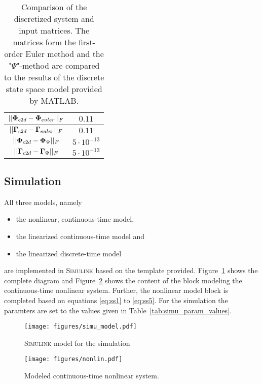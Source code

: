 \begin{table}[h]
	\centering
	\begin{tabular}{c|c}
	\hline
		 $||\boldsymbol{\Phi}_{c2d} - \boldsymbol{\Phi}_{euler}||_F$& $0.11$ \\\hline
		 $||\boldsymbol{\Gamma}_{c2d} - \boldsymbol{\Gamma}_{euler}||_F$& $0.11$ \\\hline
		 $||\boldsymbol{\Phi}_{c2d} - \boldsymbol{\Phi}_{\Psi}||_F$& $5 \cdot 10^{-13}$ \\\hline
		 $||\boldsymbol{\Gamma}_{c2d} - \boldsymbol{\Gamma}_{\Psi}||_F$& $5 \cdot 10^{-13}$ \\\hline
	\end{tabular}
	\caption{Comparison of the discretized system and input matrices. The matrices form the first-order Euler method and the "$\Psi$"-method are compared to the results of the discrete state space model provided by MATLAB.}
	\label{tab:disc_comp}
\end{table}

\subsection{Simulation}
All three models, namely
\begin{itemize}
	\item the nonlinear, continuous-time model,
	\item the linearized continuous-time model and
	\item the linearized discrete-time model
\end{itemize}
are implemented in \textsc{Simulink} based on the template provided. 
Figure~\ref{fig:simu_simulink} shows the complete diagram and Figure~\ref{fig:simu_nonlin_simulink} shows the content of the block modeling the continuous-time nonlinear system.
Further, the nonlinear model block is completed based on equations \eqref{eq:ss1} to \eqref{eq:ss5}.
For the simulation the paramters are set to the values given in Table~\ref{tab:simu_param_values}.

\begin{figure}[h]
	\centering
	\texttt{[image: figures/simu\_model.pdf]}
	\caption{\textsc{Simulink} model for the simulation}
	\label{fig:simu_simulink}
\end{figure}
\begin{figure}[h]
	\centering
	\texttt{[image: figures/nonlin.pdf]}
	\caption{Modeled continuous-time nonlinear system.}
	\label{fig:simu_nonlin_simulink}
\end{figure}

